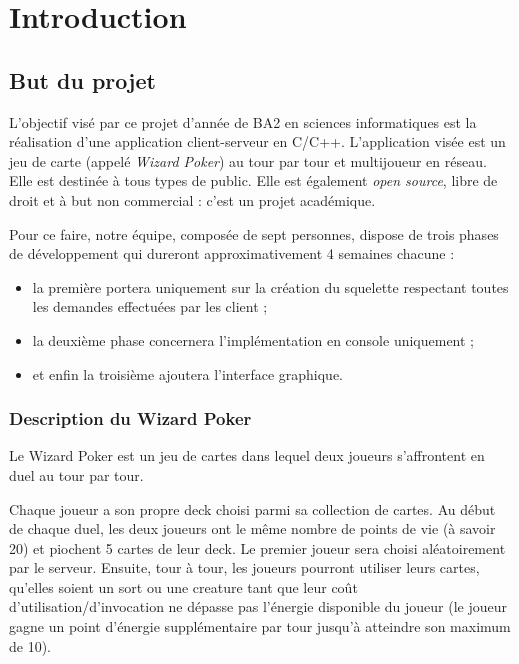 \documentclass[12pt]{article}
\let\simplesection\section
\renewcommand{\section}{\clearpage\simplesection}
\let\simplesubsection\subsection
\renewcommand{\subsection}{
	\needspace{0.5\pagetotal}
	\simplesubsection
}
\begin{document}

\tableofcontents

\section{Introduction}
	\subsection{But du projet}
		L'objectif visé par ce projet d'année de BA2 en sciences informatiques est la réalisation d'une application client-serveur en C/C++. L'application visée est
		un jeu de carte (appelé \textit{Wizard Poker}) au tour par tour et multijoueur en réseau. Elle est destinée à tous types de public. Elle est également
		\textit{open source}, libre de droit et à but non commercial : c'est un projet académique.

		Pour ce faire, notre équipe, composée de sept personnes, dispose de trois phases de développement qui dureront approximativement 4 semaines chacune :
		\begin{itemize}
			\item la première portera uniquement sur la création du squelette respectant toutes les demandes effectuées par les client ;
			\item la deuxième phase concernera l'implémentation en console uniquement ;
			\item et enfin la troisième ajoutera l'interface graphique.
		\end{itemize}

		\subsubsection{Description du Wizard Poker}
			Le Wizard Poker est un jeu de cartes dans lequel deux joueurs s'affrontent en \gls{duel} au tour par tour.
			
			Chaque joueur a son propre \gls{deck} choisi parmi sa collection de cartes. Au début de chaque \gls{duel}, les deux joueurs ont le même nombre de points de vie (à savoir 20) et piochent 5 cartes de leur \gls{deck}.
			Le premier joueur sera choisi aléatoirement par le serveur. Ensuite, tour à tour, les joueurs pourront utiliser leurs cartes, qu'elles soient un \gls{sort} ou une \gls{creature} tant que leur coût d'utilisation/d'invocation ne dépasse pas l'énergie disponible du joueur (le joueur gagne un point d'énergie supplémentaire par tour jusqu'à atteindre son maximum de 10).
			
\end{document}
